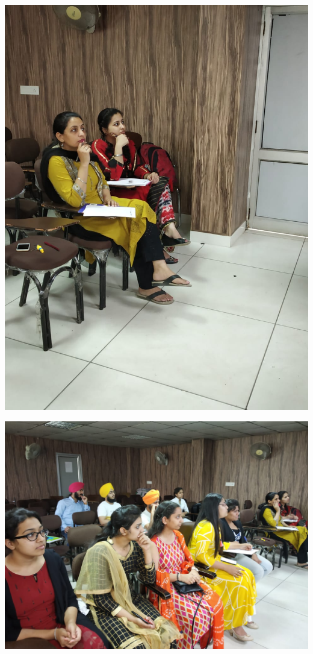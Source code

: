 \documentclass[12pt, a4 paper]{article}
\begin{document}
\begin{center}
\begin{Large}
\begin{multicols}{2}
\columnbreak
\includegraphics[width=\linewidth]{image4.jpg}
  
\end{multicols}
\bigskip
\justify

\bigskip
\begin{multicols}{2}
\justify
\includegraphics[width=\linewidth]{image3.jpg}


\end{multicols}
\end{Large}
\end{center}
\end{document}
